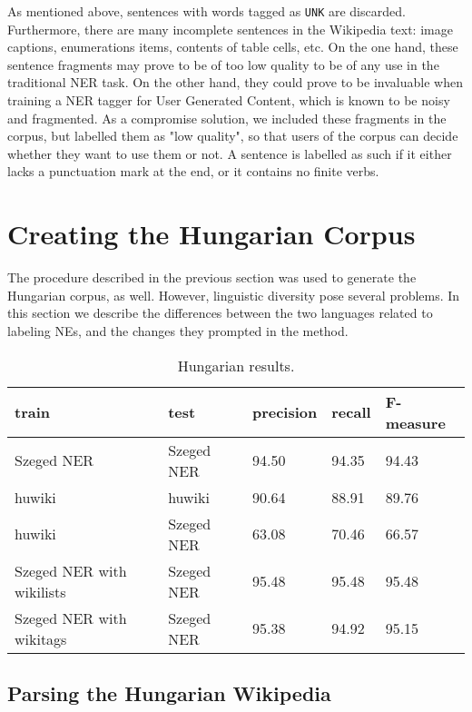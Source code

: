 \documentclass[11pt]{article}
\begin{document}
As mentioned above, sentences with words tagged as \texttt{UNK} are discarded. Furthermore, there are many incomplete sentences in the Wikipedia text: image captions, enumerations items, contents of table cells, etc. On the one hand, these sentence fragments may prove to be of too low quality to be of any use in the traditional NER task. On the other hand, they could prove to be invaluable when training a NER tagger for User Generated Content, which is known to be noisy and fragmented. As a compromise solution, we included these fragments in the corpus, but labelled them as "low quality", so that users of the corpus can decide whether they want to use them or not. A sentence is labelled as such if it either lacks a punctuation mark at the end, or it contains no finite verbs.

\section{Creating the Hungarian Corpus}
\label{sec:hun}

The procedure described in the previous section was used to generate the Hungarian corpus, as well. However, linguistic diversity pose several problems. In this section we describe the differences between the two languages related to labeling NEs, and the changes they prompted in the method.

\begin{table*}[ht]
\begin{center}
\begin{tabular}{lllll}
\hline \bf train & \bf test & \bf precision & \bf recall & \bf F-measure \\ \hline
Szeged NER & Szeged NER & 94.50 & 94.35 & 94.43 \\
huwiki & huwiki & 90.64 & 88.91 &  89.76 \\
huwiki & Szeged NER & 63.08 & 70.46 & 66.57 \\
Szeged NER with wikilists & Szeged NER & 95.48 & 95.48 & 95.48 \\
Szeged NER with wikitags & Szeged NER & 95.38 & 94.92 & 95.15 \\
\hline
\end{tabular}
\end{center}
\caption{\label{huresults} Hungarian results.}
\end{table*}

\subsection{Parsing the Hungarian Wikipedia}
\end{document}

